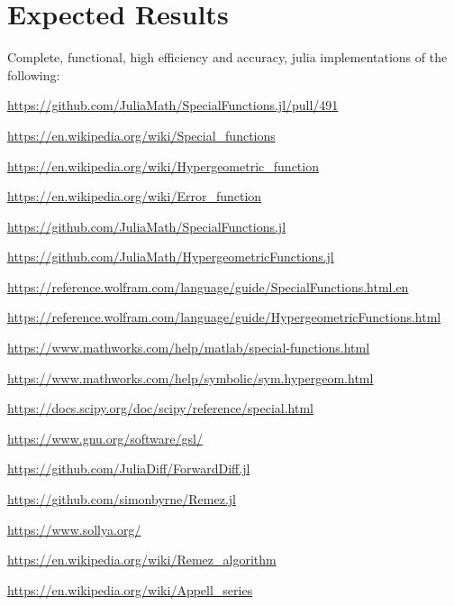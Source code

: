 \documentclass{article}
\theoremstyle{mytheoremstyle}
\theoremstyle{mytheoremstyle}
\theoremstyle{myproblemstyle}
\begin{document}
  \section*{Expected Results}\label{sec:Results} %
    Complete, functional, high efficiency and accuracy, julia implementations of the following:
  
    
    \begin{thebibliography}{9}
      \url{https://github.com/JuliaMath/SpecialFunctions.jl/pull/491}

      \url{https://en.wikipedia.org/wiki/Special_functions}  

      \url{https://en.wikipedia.org/wiki/Hypergeometric_function}

      \url{https://en.wikipedia.org/wiki/Error_function}

      \url{https://github.com/JuliaMath/SpecialFunctions.jl}

      \url{https://github.com/JuliaMath/HypergeometricFunctions.jl}

      \url{https://reference.wolfram.com/language/guide/SpecialFunctions.html.en}

      \url{https://reference.wolfram.com/language/guide/HypergeometricFunctions.html}

      \url{https://www.mathworks.com/help/matlab/special-functions.html}

      \url{https://www.mathworks.com/help/symbolic/sym.hypergeom.html}

      \url{https://docs.scipy.org/doc/scipy/reference/special.html}

      \url{https://www.gnu.org/software/gsl/}

      \url{https://github.com/JuliaDiff/ForwardDiff.jl}

      \url{https://github.com/simonbyrne/Remez.jl}

      \url{https://www.sollya.org/}

      \url{https://en.wikipedia.org/wiki/Remez_algorithm}

      \url{https://en.wikipedia.org/wiki/Appell_series}
    \end{thebibliography}
  
\end{document}
